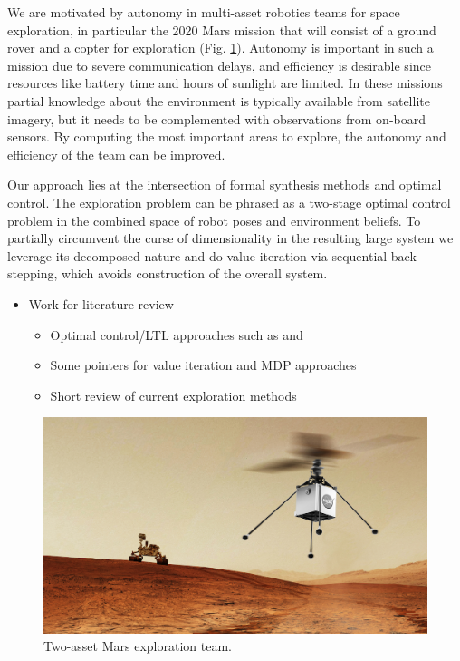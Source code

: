 \documentclass[conference]{IEEEtran}
\begin{document}
We are motivated by autonomy in multi-asset robotics teams for space exploration, in particular the 2020 Mars mission that will consist of a ground rover and a copter for exploration (Fig. \ref{fig:heli-rover}). Autonomy is important in such a mission due to severe communication delays, and efficiency is desirable since resources like battery time and hours of sunlight are limited. In these missions partial knowledge about the environment is typically available from satellite imagery, but it needs to be complemented with observations from on-board sensors. By computing the most important areas to explore, the autonomy and efficiency of the team can be improved. 

Our approach lies at the intersection of formal synthesis methods and optimal control. The exploration problem can be phrased as a two-stage optimal control problem in the combined space of robot poses and environment beliefs. To partially circumvent the curse of dimensionality in the resulting large system we leverage its decomposed nature and do value iteration via sequential back stepping, which avoids construction of the overall system. 

\begin{itemize}
  \item Work for literature review
  \begin{itemize}
    \item Optimal control/LTL approaches such as \cite{Papusha2016} and \cite{Alora2016}
    \item Some pointers for value iteration and MDP approaches
    \item Short review of current exploration methods
  \end{itemize}
\end{itemize}

\begin{figure}
  \begin{center}
    \includegraphics[width=0.8\columnwidth]{figs/heli-rover.png}
  \end{center}
  \caption{Two-asset Mars exploration team.}
  \label{fig:heli-rover}
\end{figure}
\end{document}
